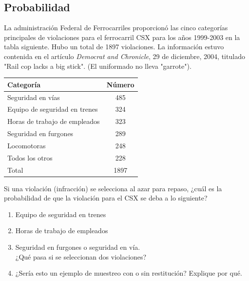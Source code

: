 \documentclass[10pt,twoside]{article}
\begin{document}
\begin{enumerate}
\section*{Probabilidad}
\begin{minipage}{.4\textwidth}
\item La administración Federal de Ferrocarriles proporcionó las cinco categorías principales de violaciones para el ferrocarril CSX para los años 1999-2003 en la tabla siguiente. Hubo un total de 1897 violaciones. La información estuvo contenida en el artículo \textit{Democrat and Chronicle}, 29 de diciembre, 2004, titulado "Rail cop lacks a big stick". (El uniformado no lleva "garrote").
\end{minipage}\hfill
\begin{minipage}{.55\textwidth}
\begin{center}
\begin{tabular}{lc}
Categor\'{i}a & N\'{u}mero \\ 
\hline 
Seguridad en v\'{i}as & 485 \\ 
Equipo de seguridad en trenes & 324 \\ 
Horas de trabajo de empleados & 323 \\ 
Seguridad en furgones & 289 \\ 
Locomotoras & 248 \\ 
Todos los otros & 228 \\ 
\hline 
Total & 1897 \\ 
\end{tabular} 
\end{center}
\end{minipage}

Si una violación (infracción) se selecciona al azar para repaso, ¿cuál es la probabilidad de que la violación para el CSX se deba a lo siguiente?
\begin{enumerate}
\item Equipo de seguridad en trenes
\item Horas de trabajo de empleados
\item Seguridad en furgones o seguridad en vía.\\
 ¿Qué pasa si se seleccionan dos violaciones?
 \item ¿Sería esto un ejemplo de muestreo con o sin restitución? Explique por qué.
\end{enumerate}

\end{enumerate}
\end{document}
